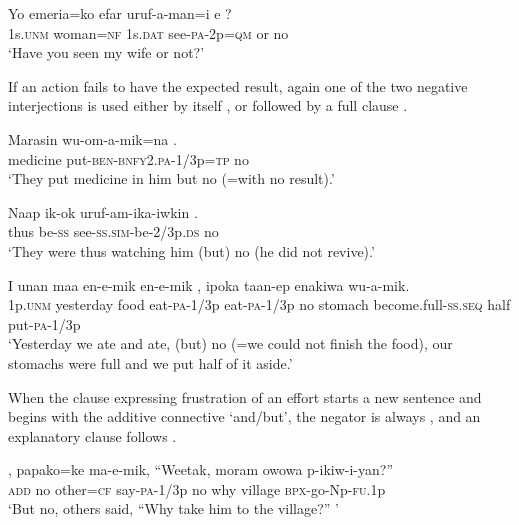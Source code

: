 \ea%
\label{ex:6:x1122}
\gll Yo  emeria=ko  efar  uruf-a-man=i  e  ? \\
1s.\textsc{unm}  woman=\textsc{nf}  1s.\textsc{dat}  see-\textsc{pa}-2p=\textsc{qm}  or  no\\
\glt `Have you seen my wife or not?'
\z

If an action fails to have the expected result, again one of the two negative interjections is used either by itself ,  or followed by a full clause . 

\ea%
\label{ex:6:x1124}
\gll Marasin  wu-om-a-mik=na  . \\
medicine  put-\textsc{ben}-\textsc{bnfy}2.\textsc{pa}-1/3p=\textsc{tp}  no\\
\glt `They put medicine in him but no (=with no result).'
\z

\ea%
\label{ex:6:x1126}
\gll Naap  ik-ok  uruf-am-ika-iwkin  . \\
thus  be-\textsc{ss}  see-\textsc{ss}.\textsc{sim}-be-2/3p.\textsc{ds}  no\\
\glt `They were thus watching him (but) no (he did not revive).'
\z

\ea%
\label{ex:6:x1123}
\gll I  unan  maa  en-e-mik  en-e-mik  , ipoka  taan-ep  enakiwa  wu-a-mik. \\
1p.\textsc{unm}  yesterday  food  eat-\textsc{pa}-1/3p  eat-\textsc{pa}-1/3p  no stomach  become.full-\textsc{ss}.\textsc{seq}  half  put-\textsc{pa}-1/3p\\
\glt `Yesterday we ate and ate, (but) no (=we could not finish the food), our stomachs were full and we put half of it aside.'
\z

When the clause expressing frustration of an effort starts a new sentence and begins with the additive connective  `and/but', the negator is always , and an explanatory clause follows .

\ea%
\label{ex:6:x1125}
\gll {}  ,  papako=ke  ma-e-mik,  ``Weetak,  moram owowa  p-ikiw-i-yan?'' \\
\textsc{add}  no  other=\textsc{cf}  say-\textsc{pa}-1/3p  no  why village  \textsc{bpx}-go-Np-\textsc{fu}.1p\\
\glt `But no, others said, ``Why take him to the village?'' '
\z

